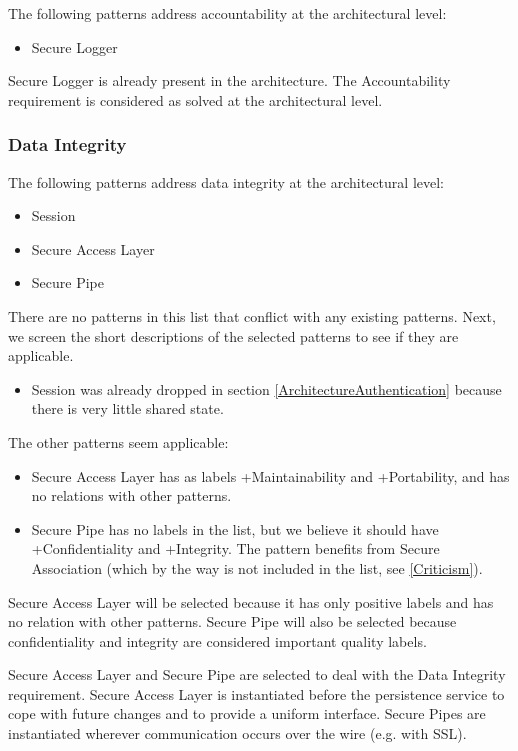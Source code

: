 \documentclass[a4paper,11pt]{report}
\begin{document}
The following patterns address accountability at the architectural level:

\begin{itemize}
\item Secure Logger
\end{itemize}
Secure Logger is already present in the architecture. The Accountability requirement is considered as solved at the architectural level.

\subsubsection{Data Integrity}
The following patterns address data integrity at the architectural level:
\begin{itemize}
\item Session
\item Secure Access Layer
\item Secure Pipe
\end{itemize}

There are no patterns in this list that conflict with any existing patterns.
Next, we screen the short descriptions of the selected patterns to see if they are applicable.
\begin{itemize}
\item Session was already dropped in section \ref{ArchitectureAuthentication} because there is very little
shared state.
\end{itemize}
The other patterns seem applicable:
\begin{itemize}
\item Secure Access Layer has as labels +Maintainability and +Portability, and has no relations with other patterns.

\item Secure Pipe has no labels in the list, but we believe it should have +Confidentiality and +Integrity. The pattern
benefits from Secure Association (which by the way is not included in the list, see \ref{Criticism}).
\end{itemize}

Secure Access Layer will be selected because it has only positive labels and has no relation with other patterns.
Secure Pipe will also be selected because confidentiality and integrity are considered important quality labels.

Secure Access Layer and Secure Pipe are selected to deal with the Data Integrity requirement. Secure Access Layer is instantiated before the persistence service to cope with future changes and to provide a uniform interface. Secure Pipes are instantiated wherever communication occurs over the wire (e.g. with SSL).
\end{document}
